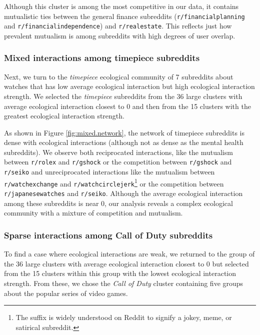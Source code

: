 \documentclass[letterpaper]{article}\usepackage[]{graphicx}\usepackage[]{color}
\def\Slash{\slash\hspace{0pt}}
\begin{document}
Although this cluster is among the most competitive in our data, it contains mutualistic ties between the general finance subreddits (\texttt{r\Slash financialplanning} and \texttt{r\Slash financialindependence}) and \texttt{r\Slash realestate}. This reflects just how prevalent mutualism is among subreddits with high degrees of user overlap. 


\subsubsection{Mixed interactions among timepiece subreddits}

Next, we turn to the \textit{timepiece} ecological community of
7 subreddits about watches that has low average ecological interaction but high ecological interaction strength. 
We selected the \textit{timepiece} subreddits from the 36 %
large clusters with average ecological interaction closest to 0 and then from the 15 clusters with the greatest ecological interaction strength.

As shown in Figure \ref{fig:mixed.network}, the network of timepiece subreddits is dense with ecological interactions (although not as dense as the mental health subreddits). We observe both reciprocated interactions, like the mutualism between \texttt{r\Slash rolex} and \texttt{r\Slash gshock} or the competition between \texttt{r\Slash gshock} and \texttt{r\Slash seiko} and unreciprocated interactions like the mutualism between \texttt{r\Slash watchexchange} and \texttt{r\Slash watchcirclejerk}\footnote{The suffix is widely understood on Reddit to signify a jokey, meme, or satirical subreddit.}
or the competition between \texttt{r\Slash japanesewatches} and \texttt{r\Slash seiko}.
Although the average ecological interaction among these subreddits is near 0, our analysis reveals a complex ecological community with a mixture of competition and mutualism.   
 
\subsubsection{Sparse interactions among Call of Duty subreddits}

To find a case where ecological interactions are weak, we returned to the group of the 36 %
large clusters with average ecological interaction closest to 0 but selected from the 15 clusters within this group with the lowest ecological interaction strength. From these, we chose the \textit{Call of Duty} cluster containing five groups about the popular series of video games.
\end{document}
